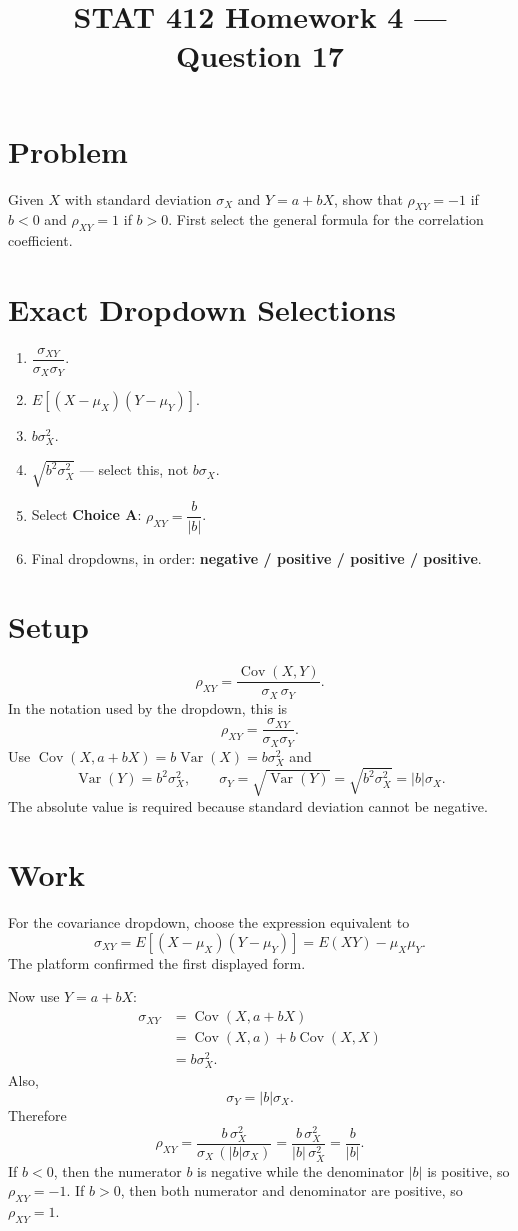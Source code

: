 \documentclass[11pt]{article}
\title{STAT 412 Homework 4 --- Question 17}
\author{}
\date{}
\begin{document}
\maketitle

\section*{Problem}
Given $X$ with standard deviation $\sigma_X$ and $Y=a+bX$, show that
$\rho_{XY}=-1$ if $b<0$ and $\rho_{XY}=1$ if $b>0$. First select the general
formula for the correlation coefficient.

\section*{Exact Dropdown Selections}
\begin{enumerate}
\item $\dfrac{\sigma_{XY}}{\sigma_X\sigma_Y}$.
\item $E[(X-\mu_X)(Y-\mu_Y)]$.
\item $b\sigma_X^2$.
\item $\sqrt{b^2\sigma_X^2}$ --- select this, not $b\sigma_X$.
\item Select \textbf{Choice A}:
$\rho_{XY}=\dfrac{b}{|b|}$.
\item Final dropdowns, in order:
\textbf{negative / positive / positive / positive}.
\end{enumerate}

\section*{Setup}
\[
\rho_{XY}=\frac{\operatorname{Cov}(X,Y)}{\sigma_X\,\sigma_Y}.
\]
In the notation used by the dropdown, this is
\[
\rho_{XY}=\frac{\sigma_{XY}}{\sigma_X\sigma_Y}.
\]
Use $\operatorname{Cov}(X,a+bX)=b\operatorname{Var}(X)=b\sigma_X^2$ and
\[
\operatorname{Var}(Y)=b^2\sigma_X^2,\qquad
\sigma_Y=\sqrt{\operatorname{Var}(Y)}
=\sqrt{b^2\sigma_X^2}=|b|\sigma_X.
\]
The absolute value is required because standard deviation cannot be negative.

\section*{Work}
For the covariance dropdown, choose the expression equivalent to
\[
\sigma_{XY}=E[(X-\mu_X)(Y-\mu_Y)]
=E(XY)-\mu_X\mu_Y.
\]
The platform confirmed the first displayed form.

Now use $Y=a+bX$:
\[
\begin{aligned}
\sigma_{XY}
&=\operatorname{Cov}(X,a+bX)\\
&=\operatorname{Cov}(X,a)+b\operatorname{Cov}(X,X)\\
&=b\sigma_X^2.
\end{aligned}
\]
Also,
\[
\sigma_Y=|b|\sigma_X.
\]
Therefore
\[
\rho_{XY}=\frac{b\,\sigma_X^2}{\sigma_X\,(|b|\sigma_X)}
=\frac{b\,\sigma_X^2}{|b|\,\sigma_X^2}=\frac{b}{|b|}.
\]
If $b<0$, then the numerator $b$ is negative while the denominator $|b|$ is
positive, so $\rho_{XY}=-1$. If $b>0$, then both numerator and denominator are
positive, so $\rho_{XY}=1$.
\end{document}
